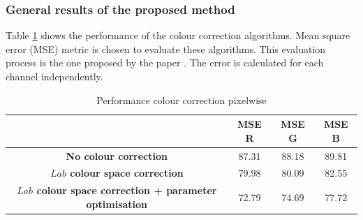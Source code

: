 \subsubsection{General results of the proposed method}

Table \ref{tab:mse_color} shows the performance of the colour correction algorithms. Mean square error (MSE) metric is chosen to evaluate these algorithms. This evaluation process is the one proposed by the paper \cite{dasari_reference_2016}. The error is calculated for each channel independently.

\begin{table}[H]
\begin{tabular}{c|c|c|c}
\textbf{} & \textbf{MSE R} & \textbf{MSE G} & \textbf{MSE B} \\ \hline
\textbf{No colour correction} & 87.31 & 88.18 & 89.81 \\ \hline
\textbf{$Lab$ colour space correction} & 79.98 & 80.09 & 82.55 \\ \hline
\textbf{$Lab$ colour space correction + parameter optimisation} & 72.79 & 74.69 & 77.72
\end{tabular}
\caption{Performance colour correction pixelwise}
\label{tab:mse_color}
\end{table}


